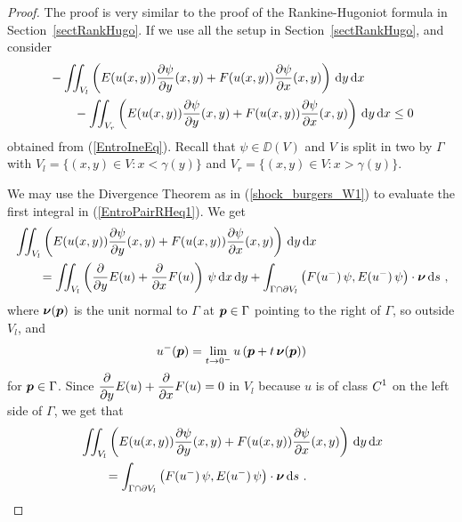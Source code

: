 
\begin{proof}
The proof is very similar to the proof of the Rankine-Hugoniot formula
in Section~\ref{sectRankHugo}.  If we use all the setup in
Section~\ref{sectRankHugo}, and consider
\begin{equation} \label{EntroPairRHeq1}
\begin{split}
&-\iint_{V_l} \left( E(u(x,y)) \pdydx{\psi}{y}(x,y) +
  F(u(x,y)) \pdydx{\psi}{x}(x,y) \right) \dx{y}\dx{x} \\
&\qquad -\iint_{V_r} \left( E(u(x,y)) \pdydx{\psi}{y}(x,y) +
  F(u(x,y)) \pdydx{\psi}{x}(x,y) \right) \dx{y}\dx{x} \leq 0
\end{split}
\end{equation}
obtained from (\ref{EntroIneEq}).
Recall that $\psi \in \DD(V)$ and $V$ is split in two by $\Gamma$ with
$V_l = \{ (x,y) \in V : x < \gamma(y)\}$ and
$V_r = \{ (x,y) \in V : x > \gamma(y)\}$.

We may use the Divergence Theorem as in (\ref{shock_burgers_W1}) to
evaluate the first integral in (\ref{EntroPairRHeq1}).  We get
\begin{align*}
&\iint_{V_l}
\left( E(u(x,y)) \pdydx{\psi}{y}(x,y) +
F(u(x,y)) \pdydx{\psi}{x}(x,y) \right) \dx{y}\dx{x} \\
&\qquad = \iint_{V_l}
\left( \pdfdx{E(u)}{y} + \pdfdx{F(u)}{x} \right)\,\psi
\dx{x}\dx{y}
+ \int_{\Gamma \cap \partial V_l} \left(F(u^-)\,\psi, E(u^-)\,\psi \right)\cdot
\VEC{\nu} \dx{s} \ ,
\end{align*}
where $\DS \VEC{\nu}(\VEC{p})$ is the unit normal to $\Gamma$
at $\VEC{p} \in \Gamma$ pointing to the right of $\Gamma$, so outside
$V_l$, and
\[
u^-(\VEC{p}) = \lim_{t\rightarrow 0^-}
u\left(\VEC{p}+t\, \VEC{\nu}(\VEC{p})\right)
\]
for $\VEC{p} \in \Gamma$.
Since $\DS \pdfdx{E(u)}{y} + \pdfdx{F(u)}{x} = 0$ in
$V_l$ because $u$ is of class $\DS C^1$ on the left side of
$\Gamma$, we get that
\begin{equation} \label{EntroPairRHeq2}
\begin{split}
& \iint_{V_l} \left( E(u(x,y)) \pdydx{\psi}{y}(x,y) +
F(u(x,y)) \pdydx{\psi}{x}(x,y) \right) \dx{y}\dx{x} \\
&\qquad = \int_{\Gamma \cap \partial V_l}
\left(F(u^-)\,\psi, E(u^-)\,\psi \right)\cdot \VEC{\nu} \dx{s} \ .
\end{split}
\end{equation}


\end{proof}
